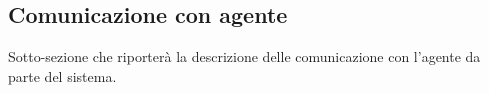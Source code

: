 \subsection{Comunicazione con agente}

Sotto-sezione che riporterà la descrizione delle comunicazione con l'agente da parte del sistema.

